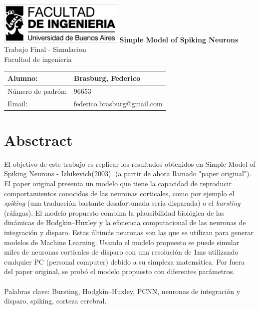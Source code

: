 \documentclass[12pt]{article}
\begin{document}
\begin{titlepage} %
	\hfill\includegraphics[width=6cm]{images/logofiuba.jpg}
    \centering
    \vfill
    \Huge \textbf{Simple Model of Spiking Neurons}
    \vskip2cm
    \Large Trabajo Final - Simulacion \\
    Facultad de ingenieria\\ %
    \vskip2cm
    \begin{tabular}{ | l | l | } %
      \hline
      Alumno: & Brasburg, Federico \\ \hline
      Número de padrón: & 96653 \\ \hline
      Email: & federico.brasburg@gmail.com \\ \hline
    \end{tabular}
    \vskip2cm
    \vfill
    \vfill
\end{titlepage}

\tableofcontents %
\newpage

\section{Absctract}\label{sec:intro}
El objetivo de este trabajo es replicar los resultados obtenidos en Simple Model of Spiking Neurons - Izhikevich(2003). \cite{paperOriginal} (a partir de ahora llamado "paper original").
El paper original presenta un modelo que tiene la capacidad de reproducir comportamientos conocidos de las neuronas corticales, como por ejemplo el \textit{spiking} (una traducción bastante desafortunada sería disparada)
o el \textit{bursting} (ráfagas). El modelo propuesto combina la plausibilidad biológica de las dinámicas de Hodgkin–Huxley \cite{HodgkinHuxley} y la eficiencia computacional de las neuronas de integración y disparo.
Estas últimás neuronas son las que se utilizan para generar modelos de Machine Learning. Usando el modelo propuesto se puede simular miles de neuronas corticales de disparo con una resolución de 1ms utilizando cualquier PC (personal computer) debido a su simpleza matemática.
Por fuera del paper original, se probó el modelo propuesto con diferentes parámetros.
\\ \\
Palabras clave: Bursting, Hodgkin–Huxley, PCNN, neuronas de integración y disparo, spiking, corteza cerebral.
\newpage
\end{document}
